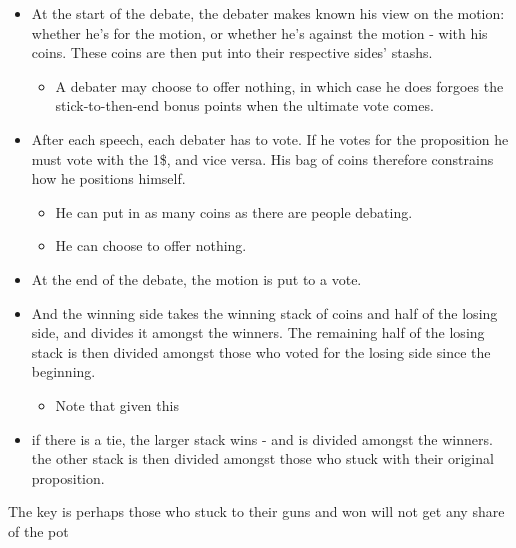 \begin{itemize}
    \item At the start of the debate, the debater makes known his view on the motion: whether he's for the motion, or whether he's against the motion - with his coins. These coins are then put into their respective sides' stashs.
    \begin{itemize}
        \item A debater may choose to offer nothing, in which case he does forgoes the stick-to-then-end bonus points when the ultimate vote comes.
    \end{itemize}
    \item After each speech, each debater has to vote. If he votes for the proposition he must vote with the 1\$, and vice versa. His bag of coins therefore constrains how he positions himself.
    \begin{itemize}
        \item He can put in as many coins as there are people debating.
        \item He can choose to offer nothing.
    \end{itemize}
    \item At the end of the debate, the motion is put to a vote.
    \item And the winning side takes the winning stack of coins and half of the losing side, and divides it amongst the winners. The remaining half of the losing stack is then divided amongst those who voted for the losing side since the beginning.
    \begin{itemize}
        \item Note that given this
    \end{itemize}
    \item if there is a tie, the larger stack wins - and is divided amongst the winners. the other stack is then divided amongst those who stuck with their original proposition.
\end{itemize}

The key is perhaps those who stuck to their guns and won will not get any share of the pot




